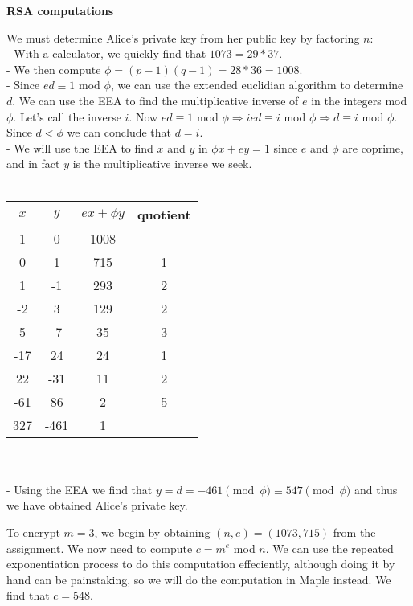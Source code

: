 \documentclass[12pt]{article}
\begin{document}
\begin{list}{.}{}
\item \textbf{RSA computations}
\begin{list}{)}{}
\item We must determine Alice's private key from her public key by factoring
$n$:\\
- With a calculator, we quickly find that $1073 = 29 * 37$.\\
- We then compute $\phi = (p-1)(q-1) = 28 * 36 = 1008$.\\
- Since $ed \equiv 1$ mod $\phi$, we can use the extended euclidian algorithm to
determine $d$.  We can use the EEA to find the multiplicative inverse of $e$ in
the integers mod $\phi$.  Let's call the inverse $i$.  Now $ed \equiv 1$ mod
$\phi \Rightarrow ied \equiv i$ mod $\phi \Rightarrow d \equiv i$ mod $\phi$.
Since $d < \phi$ we can conclude that $d = i$.\\
- We will use the EEA to find $x$ and $y$ in $\phi x + ey = 1$ since $e$ and
$\phi$ are coprime, and in fact $y$ is the multiplicative inverse we seek.\\
\\
\begin{tabular}{|c|c|c|c|}
\hline
$x$ & $y$ & $ex + \phi y$ & quotient\\
\hline
1 & 0 & 1008 & \\
0 & 1 & 715 & 1 \\
1 & -1 & 293 & 2 \\
-2 & 3 & 129 & 2 \\
5 & -7 & 35 & 3 \\
-17 & 24 & 24 & 1 \\
22 & -31 & 11 & 2 \\
-61 & 86 & 2 & 5 \\
327 & -461 & 1 & \\
\hline
\end{tabular}\\
\\
- Using the EEA we find that $y = d = -461 \pmod \phi \equiv 547 \pmod \phi$ and thus we have obtained Alice's private
key.

\item To encrypt $m = 3$, we begin by obtaining $(n,e) = (1073, 715)$ from the
assignment.  We now need to compute $c = m^e$ mod $n$.  We can use the repeated
exponentiation process to do this computation effeciently, although doing it by
hand can be painstaking, so we will do the computation in Maple instead.  We
find that $c = 548$.


\end{list}
\end{list}
\end{document}
